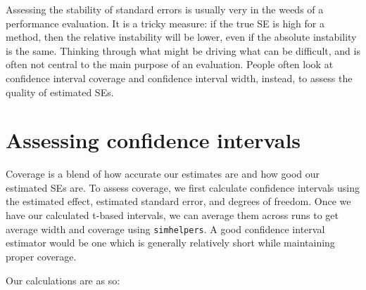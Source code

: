 \documentclass[
]{book}
\newenvironment{Shaded}{\begin{snugshade}}{\end{snugshade}}
\newcommand{\AttributeTok}[1]{\textcolor[rgb]{0.13,0.29,0.53}{#1}}
\newcommand{\FloatTok}[1]{\textcolor[rgb]{0.00,0.00,0.81}{#1}}
\newcommand{\FunctionTok}[1]{\textcolor[rgb]{0.13,0.29,0.53}{\textbf{#1}}}
\newcommand{\NormalTok}[1]{#1}
\newcommand{\OtherTok}[1]{\textcolor[rgb]{0.56,0.35,0.01}{#1}}
\newcommand{\SpecialCharTok}[1]{\textcolor[rgb]{0.81,0.36,0.00}{\textbf{#1}}}
\begin{document}
Assessing the stability of standard errors is usually very in the weeds of a performance evaluation.
It is a tricky measure: if the true SE is high for a method, then the relative instability will be lower, even if the absolute instability is the same.
Thinking through what might be driving what can be difficult, and is often not central to the main purpose of an evaluation.
People often look at confidence interval coverage and confidence interval width, instead, to assess the quality of estimated SEs.

\section{Assessing confidence intervals}\label{assessing-confidence-intervals}

Coverage is a blend of how accurate our estimates are and how good our estimated SEs are.
To assess coverage, we first calculate confidence intervals using the estimated effect, estimated standard error, and degrees of freedom.
Once we have our calculated t-based intervals, we can average them across runs to get average width and coverage using \texttt{simhelpers}.
A good confidence interval estimator would be one which is generally relatively short while maintaining proper coverage.

Our calculations are as so:

\begin{Shaded}
\end{Shaded}
\end{document}

